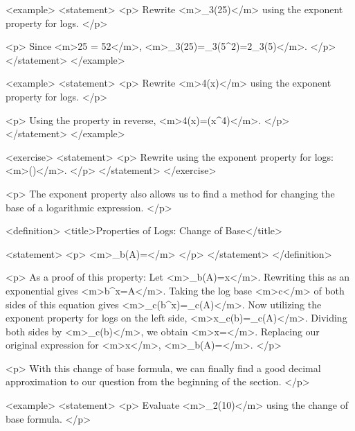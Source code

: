        <example>
            <statement>
                <p>
                    Rewrite <m>\log_{3}⁡(25)</m> using the exponent property for logs.
                </p>

                <p>
                    Since <m>25 = 52</m>, <m>\log_{3}⁡(25)=\log_{3}⁡(5^{2})=2\log_{3}⁡(5)</m>.
                </p>
            </statement>
        </example>

        <example>
            <statement>
                <p>
                    Rewrite <m>4\ln⁡(x)</m> using the exponent property for logs.
                </p>

                <p>
                    Using the property in reverse, <m>4\ln⁡(x)=\ln⁡(x^{4})</m>.
                </p>
            </statement>
        </example>

        <exercise>
            <statement>
                <p>
                    Rewrite using the exponent property for logs: <m>\ln⁡()</m>.
                </p>
            </statement>
        </exercise>

        <p>
            The exponent property also allows us to find a method for changing the base of a logarithmic expression.
        </p>

        <definition>
            <title>Properties of Logs: Change of Base</title>

            <statement>
                <p>
                    <m>\log_{b}⁡(A)=</m>
                </p>
            </statement>
        </definition>

        <p>
            As a proof of this property: Let <m>\log_{b}⁡(A)=x</m>.
            Rewriting this as an exponential gives <m>b^{x}=A</m>.
            Taking the log base <m>c</m> of both sides of this equation gives <m>\log_{c}⁡(b^{x})=\log_{c}(⁡A)</m>.
            Now utilizing the exponent property for logs on the left side, <m>x\log_{c}⁡(b)=\log_{c}(⁡A)</m>.
            Dividing both sides by <m>\log_{c}(b)</m>, we obtain <m>x=</m>.
            Replacing our original expression for <m>x</m>, <m>\log_{b}(⁡A)=</m>.
        </p>

        <p>
            With this change of base formula, we can finally find a good decimal approximation to our question from the beginning of the section.
        </p>

        <example>
            <statement>
                <p>
                    Evaluate <m>\log_{2}⁡(10)</m> using the change of base formula.
                </p>

